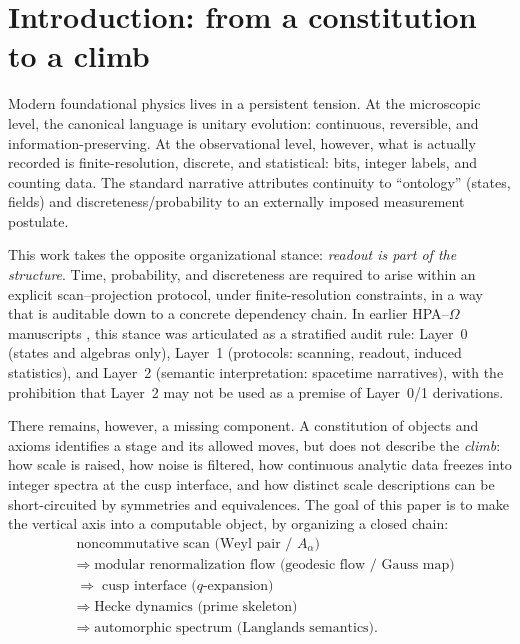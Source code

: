 
\section{Introduction: from a constitution to a climb}
\label{sec:introduction}

Modern foundational physics lives in a persistent tension. At the microscopic level, the canonical language is unitary evolution: continuous, reversible, and information-preserving. At the observational level, however, what is actually recorded is finite-resolution, discrete, and statistical: bits, integer labels, and counting data. The standard narrative attributes continuity to ``ontology'' (states, fields) and discreteness/probability to an externally imposed measurement postulate.

This work takes the opposite organizational stance: \emph{readout is part of the structure}. Time, probability, and discreteness are required to arise within an explicit scan--projection protocol, under finite-resolution constraints, in a way that is auditable down to a concrete dependency chain. In earlier HPA--$\Omega$ manuscripts \cite{Ma2025HPA,Ma2025FoP}, this stance was articulated as a stratified audit rule: Layer~0 (states and algebras only), Layer~1 (protocols: scanning, readout, induced statistics), and Layer~2 (semantic interpretation: spacetime narratives), with the prohibition that Layer~2 may not be used as a premise of Layer~0/1 derivations.

There remains, however, a missing component. A constitution of objects and axioms identifies a stage and its allowed moves, but does not describe the \emph{climb}: how scale is raised, how noise is filtered, how continuous analytic data freezes into integer spectra at the cusp interface, and how distinct scale descriptions can be short-circuited by symmetries and equivalences. The goal of this paper is to make the vertical axis into a computable object, by organizing a closed chain:
\begin{equation}
\label{eq:chain_overview}
\begin{aligned}
&\text{noncommutative scan (Weyl pair / }A_\alpha\text{)}
\\
&\Longrightarrow\; \text{modular renormalization flow (geodesic flow / Gauss map)}
\\
&\Longrightarrow\; \text{cusp interface (}q\text{-expansion)}
\\
&\Longrightarrow\; \text{Hecke dynamics (prime skeleton)}
\\
&\Longrightarrow\; \text{automorphic spectrum (Langlands semantics).}
\end{aligned}
\end{equation}

